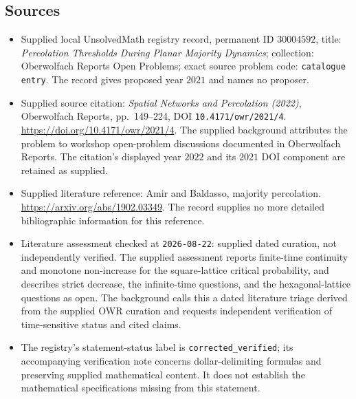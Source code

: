\documentclass[11pt]{article}
\begin{document}
\subsection{Sources}
\begin{itemize}
\item Supplied local UnsolvedMath registry record, permanent ID \(30004592\), title: \emph{Percolation Thresholds During Planar Majority Dynamics}; collection: Oberwolfach Reports Open Problems; exact source problem code: \texttt{catalogue entry}. The record gives proposed year \(2021\) and names no proposer.
\item Supplied source citation: \emph{Spatial Networks and Percolation (2022)}, Oberwolfach Reports, pp.~149--224, DOI \texttt{10.4171/owr/2021/4}. \url{https://doi.org/10.4171/owr/2021/4}. The supplied background attributes the problem to workshop open-problem discussions documented in Oberwolfach Reports. The citation's displayed year \(2022\) and its \(2021\) DOI component are retained as supplied.
\item Supplied literature reference: Amir and Baldasso, majority percolation. \url{https://arxiv.org/abs/1902.03349}. The record supplies no more detailed bibliographic information for this reference.
\item Literature assessment checked at \texttt{2026-08-22}: supplied dated curation, not independently verified. The supplied assessment reports finite-time continuity and monotone non-increase for the square-lattice critical probability, and describes strict decrease, the infinite-time questions, and the hexagonal-lattice questions as open. The background calls this a dated literature triage derived from the supplied OWR curation and requests independent verification of time-sensitive status and cited claims.
\item The registry's statement-status label is \texttt{corrected\_verified}; its accompanying verification note concerns dollar-delimiting formulas and preserving supplied mathematical content. It does not establish the mathematical specifications missing from this statement.
\end{itemize}
\end{document}
